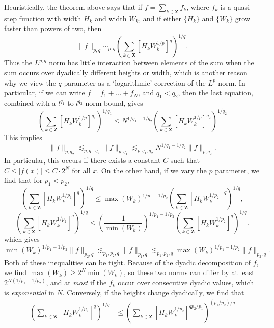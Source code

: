\begin{remark}
    Heuristically, the theorem above says that if $f = \sum_{k \in \mathbf{Z}} f_k$, where $f_k$ is a quasi-step function with width $H_k$ and width $W_k$, and if either $\{ H_k \}$ and $\{ W_k \}$ grow faster than powers of two, then
    \[ \| f \|_{p,q} \sim_{p,q} \left( \sum_{k \in \mathbf{Z}} \left[ H_k W_k^{1/p} \right]^q \right)^{1/q}. \]
    Thus the $L^{p,q}$ norm has little interaction between elements of the sum when the sum occurs over dyadically different heights or width, which is another reason why we view the $q$ parameter as a `logarithmic' correction of the $L^p$ norm. In particular, if we can write $f = f_1 + \dots + f_N$, and $q_1 < q_2$, then the last equation, combined with a $l^{q_1}$ to $l^{q_2}$ norm bound, gives
    \[ \left( \sum_{k \in \mathbf{Z}} \left[ H_k W_k^{1/p} \right]^{q_1} \right)^{1/q_1} \leq N^{1/q_1 - 1/q_2} \left( \sum_{k \in \mathbf{Z}} \left[ H_k W_k^{1/p} \right]^{q_2} \right)^{1/q_2} \]
    This implies
    \[ \| f \|_{p,q_2} \lesssim_{p,q_1,q_2} \| f \|_{p,q_1} \lesssim_{p,q_1,q_2} N^{1/q_1 - 1/q_2} \| f \|_{p,q_2}. \]
    In particular, this occurs if there exists a constant $C$ such that $C \leq |f(x)| \leq C \cdot 2^N$ for all $x$. On the other hand, if we vary the $p$ parameter, we find that for $p_1 < p_2$,
    \[ \left( \sum_{k \in \mathbf{Z}} \left[ H_k W_k^{1/p_1} \right]^q \right)^{1/q} \leq \max(W_k)^{1/p_1 - 1/p_2} \left( \sum_{k \in \mathbf{Z}} \left[H_k W_k^{1/p_2} \right]^q \right)^{1/q}, \]
    \[ \left( \sum_{k \in \mathbf{Z}} \left[ H_k W_k^{1/p_2} \right]^q \right)^{1/q} \leq \left( \frac{1}{\min(W_k)} \right)^{1/p_1 - 1/p_2} \left( \sum_{k \in \mathbf{Z}} \left[ H_k W_k^{1/p_2} \right]^q \right)^{1/q}. \]
    which gives
    \[ \min(W_k)^{1/p_1 - 1/p_2} \| f \|_{p_2,q} \lesssim_{p_1,p_2,q} \| f \|_{p_1,q} \lesssim_{p_1,p_2,q} \max(W_k)^{1/p_1 - 1/p_2} \| f \|_{p_2,q}. \]
    Both of these inequalities can be tight. Because of the dyadic decomposition of $f$, we find $\max(W_k) \geq 2^N \min(W_k)$, so these two norms can differ by at least $2^{N(1/p_1 - 1/p_2)}$, and at \emph{most} if the $f_k$ occur over consecutive dyadic values, which is \emph{exponential} in $N$. Conversely, if the heights change dyadically, we find that
    \begin{align*}
        \left( \sum_{k \in \mathbf{Z}} \left[ H_k W_k^{1/p_2} \right]^q \right)^{1/q} &\leq \left( \sum_{k \in \mathbf{Z}} \left[ H_k W_k^{1/p_2} \right]^{qp_2/p_1} \right)^{(p_1/p_2)/q}\\

\end{align*}
\end{remark}
